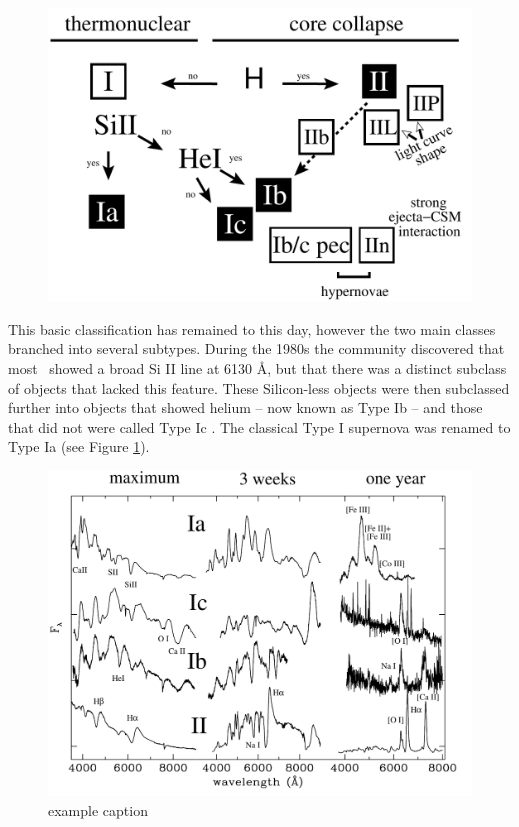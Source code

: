 \begin{figure}[htbp] %
   \centering
   \includegraphics[width=\textwidth]{chapter_intro/plots/sn_classification.pdf} 
   \caption{}
   \label{fig:sn_classification}
\end{figure}

This basic classification has remained to this day, however the two main classes branched into several subtypes.
During the 1980s the community discovered that most \sneia\ showed a broad Si II line at 6130 \AA, but that there was a distinct subclass of objects that lacked this feature. These Silicon-less objects were then subclassed further into objects that showed helium -- now known as Type Ib --  and those that did not were called Type Ic \citep{1987ApJ...317..355H, 1986ApJ...306L..77G}. The classical Type I supernova was renamed to Type Ia (see Figure \ref{fig:sn_classification}). 

\begin{figure}[htbp] %
   \centering
   \includegraphics[width=\textwidth]{chapter_intro/plots/sn_class_spectra.pdf} 
   \caption{example caption}
   \label{fig:sn_class_spectra}
\end{figure}

